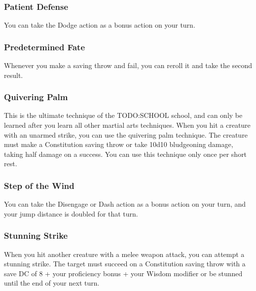 \subsubsection{Patient Defense} \label{mtec::patientdefense}
You can take the Dodge action as a bonus action on your turn.

\subsubsection{Predetermined Fate} \label{mtec::predeterminedfate}
Whenever you make a saving throw and fail, you can reroll it and take the second result.

\subsubsection{Quivering Palm} \label{mtec::quiveringpalm}
This is the ultimate technique of the TODO:SCHOOL school, and can only be learned after you learn all other martial arts techniques.
When you hit a creature with an unarmed strike, you can use the quivering palm technique.
The creature must make a Constitution saving throw or take 10d10 bludgeoning damage, taking half damage on a success.
You can use this technique only once per short rest.

\subsubsection{Step of the Wind} \label{mtec::stepofthewind}
You can take the Disengage or Dash action as a bonus action on your turn, and your jump distance is doubled for that turn.

\subsubsection{Stunning Strike} \label{mtec::stunningstrike}
When you hit another creature with a melee weapon attack, you can attempt a stunning strike.
The target must succeed on a Constitution saving throw with a save DC of 8 + your proficiency bonus + your Wisdom modifier or be stunned until the end of your next turn.
